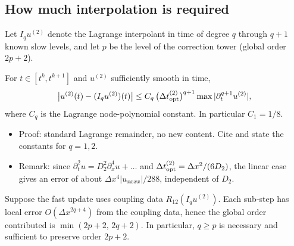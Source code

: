 \subsection{How much interpolation is required}

Let $I_q u^{(2)}$ denote the Lagrange interpolant in time of degree $q$ through $q+1$ known slow levels, and let $p$ be the level of the correction tower (global order $2p+2$).

\begin{lemma}\label{lem:interp-err}
  For $t \in [t^k, t^{k+1}]$ and $u^{(2)}$ sufficiently smooth in time,
  \[
    \bigl| u^{(2)}(t) - (I_q u^{(2)})(t) \bigr| \le C_q \, \bigl(\Delta t_{\mathrm{opt}}^{(2)}\bigr)^{q+1} \max |\partial_t^{q+1} u^{(2)}| ,
  \]
  where $C_q$ is the Lagrange node-polynomial constant. In particular $C_1 = 1/8$.
\end{lemma}

\begin{itemize}
  \item Proof: standard Lagrange remainder, no new content. Cite and state the constants for $q=1,2$.
  \item Remark: since $\partial_t^2 u = D_2^2 \partial_x^4 u + \dots$ and $\Delta t_{\mathrm{opt}}^{(2)} = \Delta x^2/(6D_2)$, the linear case gives an error of about $\Delta x^4 |u_{xxxx}|/288$, independent of $D_2$.
\end{itemize}

\begin{theorem}\label{thm:interp-degree}
  Suppose the fast update uses coupling data $R_{12} (I_q u^{(2)})$. Each sub-step has local error $O(\Delta x^{2q+4})$ from the coupling data, hence the global order contributed is $\min(2p+2,\,2q+2)$. In particular, $q \ge p$ is necessary and sufficient to preserve order $2p+2$.
\end{theorem}

